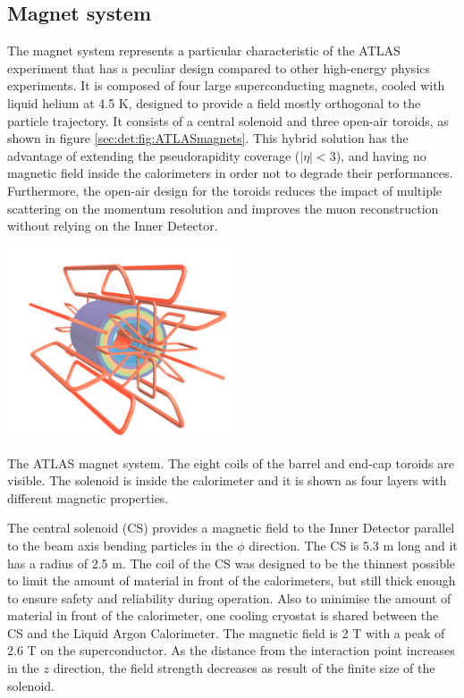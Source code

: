 \subsection{Magnet system}
The magnet system \cite{ATLASTDR1} represents a particular characteristic of the ATLAS experiment that has a peculiar design compared to other high-energy physics experiments. It is composed of four large superconducting magnets, cooled with liquid helium at 4.5 K, designed to provide a field mostly orthogonal to the particle trajectory. It consists of a central solenoid and three open-air toroids, as shown in figure \ref{sec:det:fig:ATLASmagnets}. This hybrid solution has the advantage of extending the pseudorapidity coverage ($|\eta|<3$), and having no magnetic field inside the calorimeters in order not to degrade their performances. Furthermore, the open-air design for the toroids reduces the impact of multiple scattering on the momentum resolution and improves the muon reconstruction without relying on the Inner Detector.\par
\bfig[htb!]
\centering
\includegraphics[width=0.5\textwidth]{figures/Detector/magnets.png}
\captionsetup{width=0.85\textwidth} \caption{\small The ATLAS magnet system. The eight coils of the barrel and end-cap toroids are visible. The solenoid is inside the calorimeter and it is shown as four layers with different magnetic properties.}
\label{sec:det:fig:ATLASmagnets}
\efig
The central solenoid (CS) provides a magnetic field to the Inner Detector parallel to the beam axis bending particles in the $\phi$ direction. The CS is 5.3 m long and it has a radius of 2.5 m.  The coil of the CS was designed to be the thinnest possible to limit the amount of material in front of the calorimeters, but still thick enough to ensure safety and reliability during operation. Also to minimise the amount of material in front of the calorimeter, one cooling cryostat is shared between the CS and the Liquid Argon Calorimeter. The magnetic field is 2 T with a peak of 2.6 T on the superconductor. As the distance from the interaction point increases in the $z$ direction, the field strength decreases as result of the finite size of the solenoid.\par
